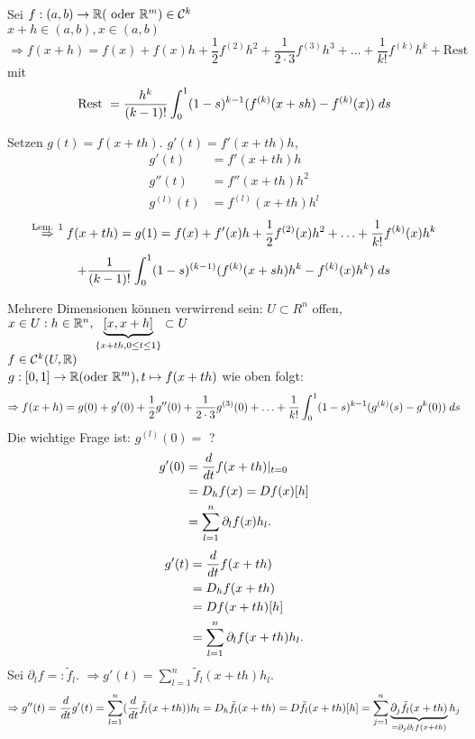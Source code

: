 \documentclass[../ana2.tex]{subfiles}
\begin{document}
\begin{kor}
    Sei \(\abb{f}{(a,b)}{\R} (\text{ oder } \R^m) \in \mathcal{C}^k \)\\
    \( x+h \in (a,b), x \in (a,b) \)
    \[ \Rightarrow f(x+h) = f(x) + f(x)h + \frac{1}{2}f^{(2)}h^2
    + \frac{1}{2 \cdot 3}f^{(3)}h^3 + \ldots + \frac{1}{k!}f^{(k)}h^k + \text{Rest} \]
    mit 
    \[ \text{Rest } = \frac{h^k}{(k-1)!} 
    \integralx{(1-s)^{k-1}(f^{(k)}(x + sh) - f^{(k)}(x))}{0}{1}{s} \]
\end{kor}
\begin{bew}
    Setzen \( g(t) = f(x + th) \). \( g'(t) = f'(x + th) h \), 
    \begin{align*}
        g'(t) &= f'(x+th)h \\
        g''(t) &= f''(x + th)h^2 \\
        g^{(l)}(t) &= f^{(l)}(x + th)h^l
    \end{align*}
    \[ \oversett{Lem. 1}{\Rightarrow} f(x+th) = g(1) = f(x) + f'(x)h
    + \frac{1}{2}f^{(2)}(x)h^2 + \ldots + \frac{1}{k!}f^{(k)}(x)h^k\]
    \[ + \frac{1}{(k-1)!} \integralx{(1-s)^{(k-1)} 
    (f^{(k)}(x+sh)h^k - f^{(k)}(x)h^k)}{0}{1}{s} \]
\end{bew}
Mehrere Dimensionen können verwirrend sein:
\( U \subset R^n \) offen, \(x \in U: h \in \R^n, 
\underbrace{[x,x+h]}_{\set{x+th, 0 \leq t \leq 1}} \subset U\)\\
\(f \in \mathcal{C}^k(U, \R)\)\\
\( \abb{g}{[0,1]}{\R} (\text{oder } \R^m), t \mapsto f(x+th) \)
wie oben folgt:
\[ \Rightarrow f(x+h) = g(0) + g'(0) + \frac{1}{2}g''(0) + \frac{1}{2 \cdot 3}g^{(3)}(0)
+ \ldots + \frac{1}{k!} \integralx{(1-s)^{k-1} (g^{(k)}(s)-g^{k}(0))}{0}{1}{s} \]
Die wichtige Frage ist: \( g^{(l)}(0) =  \) ?
\begin{align*}
    g'(0) &= \ddx{t} f(x + th) \vert_{t=0} \\
    &= D_h f(x) = Df(x)[h] \\
    &= \sum_{l=1}^n \partial_l f(x) h_l.
\end{align*}
\begin{align*}
    g'(t) &= \ddx{t} f(x + th) \\
    &= D_h f(x + th) \\
    &= Df(x + th)[h] \\
    &= \sum_{l=1}^n \partial_l f(x + th) h_l.
\end{align*}
Sei \( \partial_l f =: \tilde{f}_l \).
\( \Rightarrow g'(t) = \sum_{l=1}^n \tilde{f}_l (x + th) h_l \).
\[ \Rightarrow g''(t) = \ddx{t} g'(t) 
= \sum_{l=1}^n(\ddx{t} \tilde{f}_l(x+th))h_l
= D_h\tilde{f}_l(x+th) = D\tilde{f}_l(x+th)[h]
= \sum_{j=1}^n \underbrace{\partial_j \tilde{f}_l(x+th)}
_{= \partial_j\partial_lf(x+th)} h_j \]
\end{document}
